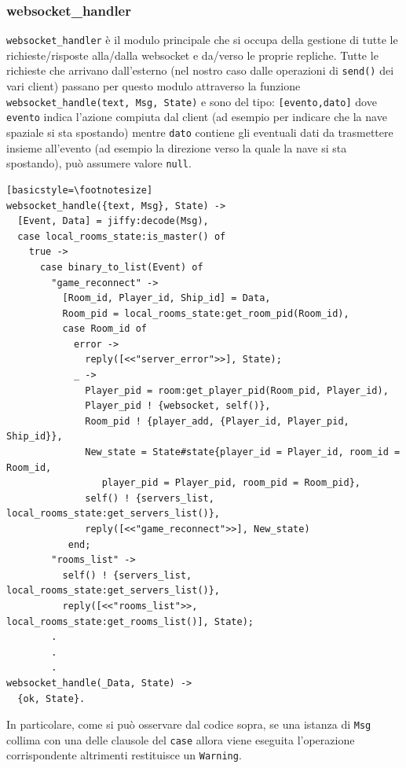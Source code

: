 \documentclass[paper=a4, fontsize=11pt]{scrartcl} %
\numberwithin{equation}{section} %
\numberwithin{figure}{section} %
\numberwithin{table}{section} %
\begin{document}
\subsubsection{websocket\_handler}
\texttt{websocket\_handler} è il modulo principale che si occupa della gestione di tutte le richieste/risposte alla/dalla websocket e da/verso le proprie repliche. Tutte le richieste che arrivano dall'esterno (nel nostro caso dalle operazioni di \texttt{send()} dei vari client) passano per questo modulo attraverso la funzione \texttt{websocket\_handle({text, Msg}, State)} e sono del tipo: \texttt{[evento,dato]} dove \texttt{evento} indica l'azione compiuta dal client (ad esempio per indicare che la nave spaziale si sta spostando) mentre \texttt{dato} contiene gli eventuali dati da trasmettere insieme all'evento (ad esempio la direzione verso la quale la nave si sta spostando), può assumere valore \texttt{null}.
\begin{lstlisting}[basicstyle=\footnotesize][basicstyle=\footnotesize]
websocket_handle({text, Msg}, State) ->
  [Event, Data] = jiffy:decode(Msg),
  case local_rooms_state:is_master() of
    true ->
      case binary_to_list(Event) of
        "game_reconnect" ->
          [Room_id, Player_id, Ship_id] = Data,
          Room_pid = local_rooms_state:get_room_pid(Room_id),
          case Room_id of
            error ->
              reply([<<"server_error">>], State);
            _ ->
              Player_pid = room:get_player_pid(Room_pid, Player_id),
              Player_pid ! {websocket, self()},
              Room_pid ! {player_add, {Player_id, Player_pid, Ship_id}},
              New_state = State#state{player_id = Player_id, room_id = Room_id,
              	 player_pid = Player_pid, room_pid = Room_pid},
              self() ! {servers_list, local_rooms_state:get_servers_list()},
              reply([<<"game_reconnect">>], New_state)
           end;
        "rooms_list" ->
          self() ! {servers_list, local_rooms_state:get_servers_list()},
          reply([<<"rooms_list">>, local_rooms_state:get_rooms_list()], State);
        .
        .
        .
websocket_handle(_Data, State) ->
  {ok, State}.
\end{lstlisting}
In particolare, come si può osservare dal codice sopra, se una istanza di \texttt{Msg} collima con una delle clausole del \texttt{case} allora viene eseguita l'operazione corrispondente altrimenti restituisce un \texttt{Warning}.

\end{document}
